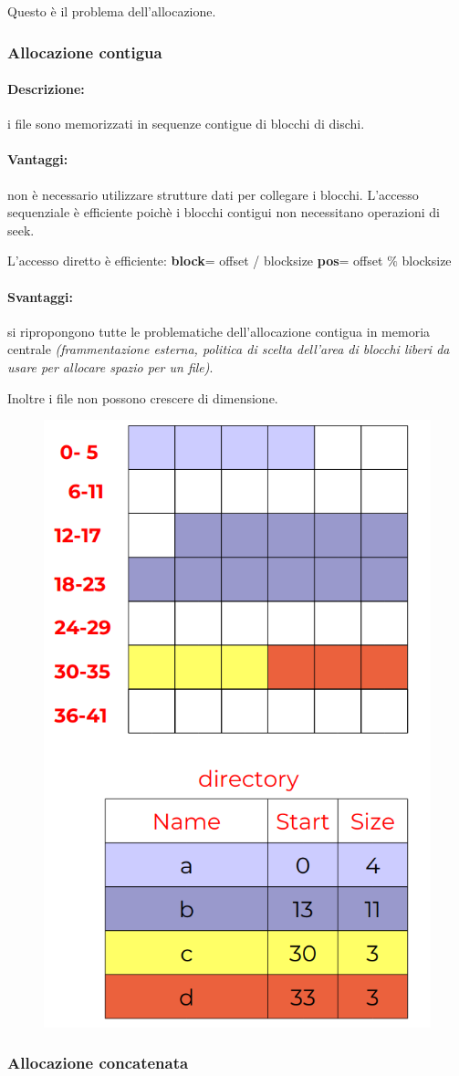 Questo è il problema dell'allocazione.
\subsubsection{Allocazione contigua}
\paragraph{Descrizione:} i file sono memorizzati in sequenze
contigue di blocchi di dischi.
\paragraph{Vantaggi:} non è necessario utilizzare strutture dati per collegare i blocchi. 
L'accesso sequenziale è efficiente poichè i blocchi contigui non necessitano operazioni di seek.

L'accesso diretto è efficiente:
\newline
\textbf{block}= offset / blocksize
\newline
\textbf{pos}= offset $\%$ blocksize

\paragraph{Svantaggi:} si ripropongono tutte le problematiche dell’allocazione contigua in memoria centrale \textit{(frammentazione esterna, politica di scelta dell’area di blocchi liberi da usare per allocare spazio per un file)}.

Inoltre i file non possono crescere di dimensione.

\begin{figure} [h]
    \centering
    \includegraphics[width=0.3\linewidth]{Images/Screenshot 2025-01-18 at 16-21-15 so-07-filesystem.pdf.png}
\end{figure}

\subsubsection{Allocazione concatenata}
